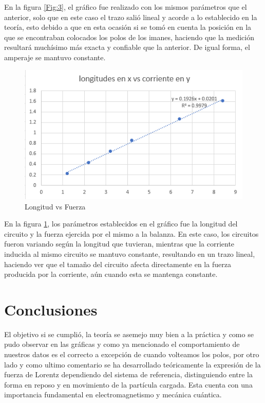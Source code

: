 \documentclass{article}
\begin{document}
En la figura \ref{Fig:3}, el gráfico fue realizado con los mismos parámetros que el anterior, solo que en este caso el trazo salió lineal y acorde a lo establecido en la teoría, esto debido a que en esta ocasión si se tomó en cuenta la posición en la que se encontraban colocados los polos de los imanes, haciendo que la medición resultará muchísimo más exacta y confiable que la anterior. De igual forma, el amperaje se mantuvo constante.

\begin{figure}[H]
   \centering
   \includegraphics[scale=0.6]{../imgs/o3.png}
   \caption{Longitud vs Fuerza}
   \label{Fig:4}
\end{figure}

En la figura \ref{Fig:4}, los parámetros establecidos en el gráfico fue la longitud del circuito y la fuerza ejercida por el mismo a la balanza. En este caso, los circuitos fueron variando según la longitud que tuvieran, mientras que la corriente inducida al mismo circuito se mantuvo constante, resultando en un trazo lineal,  haciendo ver que el tamaño del circuito afecta directamente en la fuerza producida por la corriente, aún cuando esta se mantenga constante.



\section{Conclusiones}\label{Conclusiones}				%
El objetivo si se cumplió, la teoría se asemejo muy bien a la práctica y como se pudo observar en las gráficas y como ya mencionado el comportamiento de nuestros datos es el correcto a excepción de cuando volteamos los polos, por otro lado y como ultimo comentario
se ha desarrollado teóricamente la expresión de la fuerza de Lorentz dependiendo del sistema de referencia, distinguiendo entre la forma en reposo y en movimiento de la partícula cargada. Esta cuenta con una importancia fundamental en electromagnetismo y mecánica cuántica.
\end{document}
